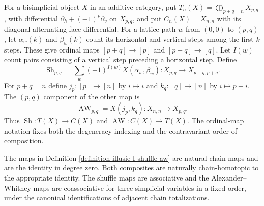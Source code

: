 \begin{definition}
\label{definition-illusie-I-shuffle-aw}
For a bisimplicial object $X$ in an additive category, put
$T_n(X)=\bigoplus_{p+q=n}X_{p,q}$, with differential
$\partial_h+(-1)^p\partial_v$ on $X_{p,q}$, and put
$C_n(X)=X_{n,n}$ with its diagonal alternating-face differential.
For a lattice path $w$ from $(0,0)$ to $(p,q)$, let
$\alpha_w(k)$ and $\beta_w(k)$ count its horizontal and vertical steps
among the first $k$ steps. These give ordinal maps
$[p+q]\to[p]$ and $[p+q]\to[q]$. Let $I(w)$ count pairs consisting of a
vertical step preceding a horizontal step. Define
\[
 \operatorname{Sh}_{p,q}=\sum_w(-1)^{I(w)}X(\alpha_w,\beta_w):
 X_{p,q}\longrightarrow X_{p+q,p+q}.
\]
For $p+q=n$ define $j_p:[p]\to[n]$ by $i\mapsto i$ and
$k_q:[q]\to[n]$ by $i\mapsto p+i$. The $(p,q)$ component of the other map is
\[
 \operatorname{AW}_{p,q}=X(j_p,k_q):X_{n,n}\longrightarrow X_{p,q}.
\]
Thus $\operatorname{Sh}:T(X)\to C(X)$ and
$\operatorname{AW}:C(X)\to T(X)$. The ordinal-map notation fixes both
the degeneracy indexing and the contravariant order of composition.
\end{definition}

\begin{theorem}
\label{theorem-illusie-I-eilenberg-zilber}
The maps in Definition \ref{definition-illusie-I-shuffle-aw} are natural
chain maps and are the identity in degree zero. Both composites are naturally
chain-homotopic to the appropriate identity. The shuffle maps are associative
and the Alexander--Whitney maps are coassociative for three simplicial
variables in a fixed order, under the canonical identifications of adjacent
chain totalizations.
\end{theorem}

